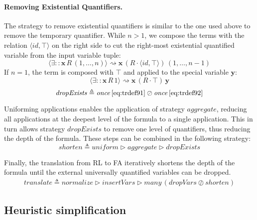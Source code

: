 \documentclass{llncs}
\begin{document}
\paragraph{Removing Existential Quantifiers.} The strategy to remove
existential quantifiers is similar to the one used above to remove the
temporary quantifier. While $n > 1$, we compose the terms with the
relation $\langle id, \top \rangle$ on the right side to cut the
right-most existential quantified variable from the input variable tuple:
\begin{equation}
\langle \exists :: \mathbf{x} \, R \, (1, \dots, n) \rangle \rightsquigarrow \mathbf{x} \, (R \cdot \langle id, \top \rangle) \, (1, \dots, n-1) \label{eq:trdef91}
\end{equation}
If $n = 1$, the term is composed with $\top$ and applied to the special variable $\mathbf{y}$:
\begin{equation}
\langle \exists :: \mathbf{x} \, R \, 1 \rangle \rightsquigarrow \mathbf{x} \, (R \cdot \top) \, \mathbf{y} \label{eq:trdef92}
\end{equation}
\begin{equation*}
\mathit{dropExists} \triangleq \mathit{once} \, \eqref{eq:trdef91} \oslash \mathit{once} \, \eqref{eq:trdef92}
\end{equation*}

Uniforming applications enables the application of strategy
$aggregate$, reducing all applications at the deepest level of the
formula to a single application. This in turn allows strategy
$dropExists$ to remove one level of quantifiers, thus reducing the
depth of the formula. These steps can be combined in the following strategy:
\begin{equation*}
  \mathit{shorten} \triangleq \mathit{uniform} \triangleright \mathit{aggregate} \triangleright \mathit{dropExists}
\end{equation*}

Finally, the translation from RL to FA iteratively shortens the depth
of the formula until the external universally quantified variables can
be dropped.
\begin{align*}
\mathit{translate} \triangleq \mathit{normalize} \triangleright \mathit{insertVars} \triangleright \mathit{many} \, (\mathit{dropVars} \oslash \mathit{shorten})
\end{align*}


\subsection{Heuristic simplification}
\label{sec:heuristics}
\end{document}
